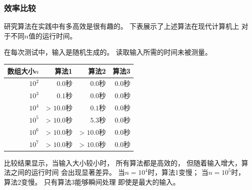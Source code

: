 \subsubsection{效率比较}

研究算法在实践中有多高效是很有趣的。
下表展示了上述算法在现代计算机上
对于不同$n$值的运行时间。

在每次测试中，输入是随机生成的。
读取输入所需的时间未被测量。

\begin{center}
\begin{tabular}{rrrr}
数组大小$n$ & 算法1 & 算法2 & 算法3 \\
\hline
$10^2$ & $0.0$秒 & $0.0$秒 & $0.0$秒 \\
$10^3$ & $0.1$秒 & $0.0$秒 & $0.0$秒 \\
$10^4$ & > $10.0$秒 & $0.1$秒 & $0.0$秒 \\
$10^5$ & > $10.0$秒 & $5.3$秒 & $0.0$秒 \\
$10^6$ & > $10.0$秒 & > $10.0$秒 & $0.0$秒 \\
$10^7$ & > $10.0$秒 & > $10.0$秒 & $0.0$秒 \\
\end{tabular}
\end{center}

比较结果显示，当输入大小较小时，
所有算法都是高效的，
但随着输入增大，算法之间的运行时间
会出现显著差异。
当$n=10^4$时，算法1变慢；
当$n=10^5$时，算法2变慢。
只有算法3能够瞬间处理
即使是最大的输入。
